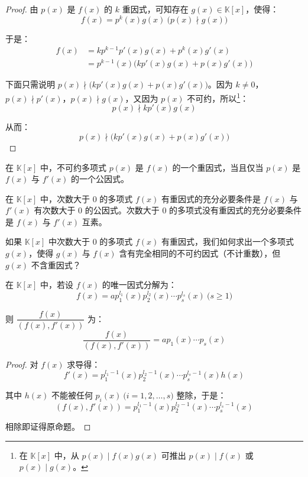 \begin{proof}
	由 $p(x)$ 是 $f(x)$ 的 $k$ 重因式，可知存在 $g(x) \in \mathbb K[x]$，使得：
	$$
	f(x) = p^k(x) g(x) \pod{p(x) \nmid g(x)}
	$$

	于是：
	$$
	\begin{aligned}
		f(x) &= k p^{k - 1} p'(x) g(x) + p^k(x) g'(x)
		\\&=
		p^{k - 1}(x) \bigl( k p'(x) g(x) + p(x) g'(x) \bigr)
	\end{aligned}
	$$

	下面只需说明 $p(x) \nmid \bigl( k p'(x) g(x) + p(x) g'(x) \bigr)$。因为 $k \ne 0$，$p(x) \nmid p'(x)$，$p(x) \nmid g(x)$，又因为 $p(x)$ 不可约，所以\footnote{在 $\mathbb K[x]$ 中，从 $p(x) \mid f(x) g(x)$ 可推出 $p(x) \mid f(x)$ 或 $p(x) \mid g(x)$。}：
	$$
	p(x) \nmid k p'(x) g(x)
	$$

	从而：
	$$
	p(x) \nmid \bigl( k p'(x) g(x) + p(x) g'(x) \bigr)
	$$
\end{proof}

\begin{proposition}
	在 $\mathbb K[x]$ 中，不可约多项式 $p(x)$ 是 $f(x)$ 的一个重因式，当且仅当 $p(x)$ 是 $f(x)$ 与 $f'(x)$ 的一个公因式。
\end{proposition}

\begin{proposition}
	在 $\mathbb K[x]$ 中，次数大于 $0$ 的多项式 $f(x)$ 有重因式的充分必要条件是 $f(x)$ 与 $f'(x)$ 有次数大于 $0$ 的公因式。次数大于 $0$ 的多项式没有重因式的充分必要条件是 $f(x)$ 与 $f'(x)$ 互素。
\end{proposition}

如果 $\mathbb K[x]$ 中次数大于 $0$ 的多项式 $f(x)$ 有重因式，我们如何求出一个多项式 $g(x)$，使得 $g(x)$ 与 $f(x)$ 含有完全相同的不可约因式（不计重数），但 $g(x)$ 不含重因式？

\begin{proposition}
	在 $\mathbb K[x]$ 中，若设 $f(x)$ 的唯一因式分解为：
	$$
	f(x) = a p_1^{l_1}(x) p_2^{l_2}(x) \cdots p_s^{l_s}(x) \pod{s \ge 1}
	$$

	则 $\dfrac{f(x)}{(f(x), f'(x))}$ 为：
	$$
	\dfrac{f(x)}{(f(x), f'(x))} = a p_1(x) \cdots p_s(x)
	$$
\end{proposition}

\begin{proof}
	对 $f(x)$ 求导得：
	$$
	f'(x) = p_1^{l_1 - 1}(x) p_2^{l_2 - 1}(x) \cdots p_s^{l_s - 1}(x) h(x)
	$$

	其中 $h(x)$ 不能被任何 $p_i(x) \pod{i = 1, 2, \ldots, s}$ 整除，于是：
	$$
	(f(x), f'(x)) = p_1^{l_1 - 1}(x) p_2^{l_2 - 1}(x) \cdots p_s^{l_s - 1}(x)
	$$

	相除即证得原命题。
\end{proof}

